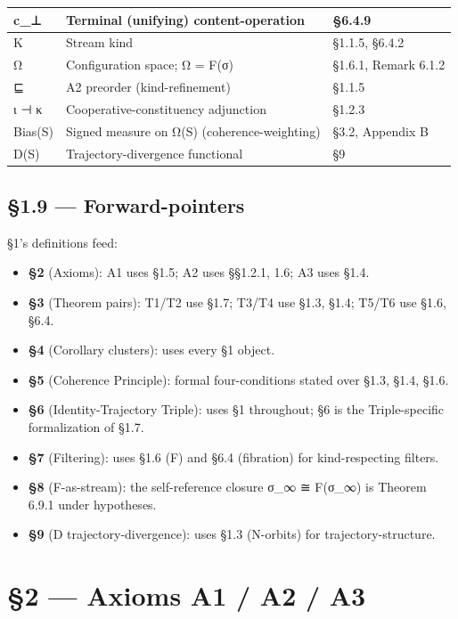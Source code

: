 \documentclass[11pt, openany]{book}
\newcommand{\sectionbreak}{\clearpage}
\begin{document}
\begin{longtable}{p{0.96in} p{2.49in} p{0.88in}}
\midrule
c\_\allowbreak{}⊥ & Terminal (unifying) content-operation & §6.4.9 \\
\midrule
K & Stream kind & §1.1.5, §6.4.2 \\
\midrule
Ω & Configuration space; Ω = F(σ) & §1.6.1, Remark 6.1.2 \\
\midrule
⊑ & A2 preorder (kind-refinement) & §1.1.5 \\
\midrule
ι ⊣ κ & Cooperative-constituency adjunction & §1.2.3 \\
\midrule
Bias(S) & Signed measure on Ω(S) (coherence-weighting) & §3.2, Appendix B \\
\midrule
D(S) & Trajectory-divergence functional & §9 \\
\bottomrule
\end{longtable}
\endgroup
\sectionbreak

\section{§1.9 --- Forward-pointers}

§1's definitions feed:
\begin{itemize}
\item \textbf{§2} (Axioms): A1 uses §1.5; A2 uses §§1.2.1, 1.6; A3 uses §1.4.
\item \textbf{§3} (Theorem pairs): T1/T2 use §1.7; T3/T4 use §1.3, §1.4; T5/T6 use §1.6, §6.4.
\item \textbf{§4} (Corollary clusters): uses every §1 object.
\item \textbf{§5} (Coherence Principle): formal four-conditions stated over §1.3, §1.4, §1.6.
\item \textbf{§6} (Identity-Trajectory Triple): uses §1 throughout; §6 is the Triple-specific formalization of §1.7.
\item \textbf{§7} (Filtering): uses §1.6 (F) and §6.4 (fibration) for kind-respecting filters.
\item \textbf{§8} (F-as-stream): the self-reference closure σ\_\allowbreak{}∞ ≅ F(σ\_\allowbreak{}∞) is Theorem 6.9.1 under hypotheses.
\item \textbf{§9} (D trajectory-divergence): uses §1.3 (N-orbits) for trajectory-structure.
\end{itemize}

\sectionbreak


\chapter{§2 — Axioms A1 / A2 / A3}
\end{document}

